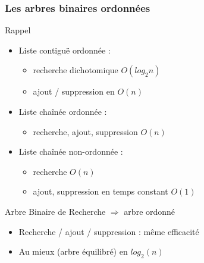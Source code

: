 \documentclass[table,handout,tikz,12pt,svgnames]{beamer}
\begin{document}
\begin{frame}[fragile=singleslide]
	\frametitle{Les arbres binaires ordonnées}
	\begin{block}{Rappel}
		\begin{itemize}
			\item Liste contiguë ordonnée : 
			\begin{itemize}
				\item recherche dichotomique $O(log_2n)$\\
				\item ajout / suppression en $O(n)$
			\end{itemize}
			\item Liste chaînée ordonnée :
			\begin{itemize}
				\item recherche, ajout, suppression $O(n)$\\
			\end{itemize}
			\item Liste chaînée non-ordonnée :
			\begin{itemize}
				\item recherche $O(n)$
				\item ajout, suppression en temps constant $O(1)$
			\end{itemize}
		\end{itemize}
	\end{block}
	\begin{block}{Arbre Binaire de Recherche $\Rightarrow$ arbre ordonné}
		\begin{itemize}
			\item Recherche / ajout / suppression : même efficacité
			\item Au mieux (arbre équilibré) en $log_2(n)$
		\end{itemize}
	\end{block}
\end{frame}
\end{document}
